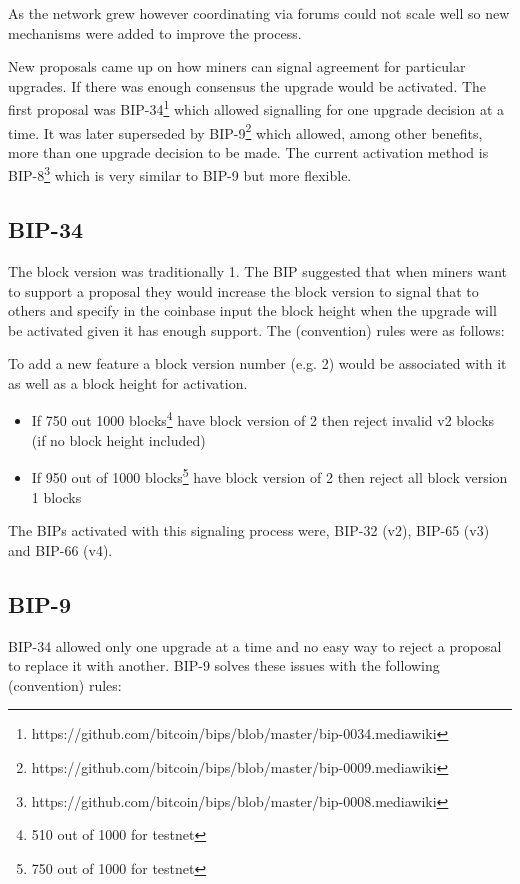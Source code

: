 As the network grew however coordinating via forums could not scale well so new mechanisms were added to improve the process.

New proposals came up on how miners can signal agreement for particular upgrades. If there was enough consensus the upgrade would be activated. The first proposal was BIP-34\footnote{https://github.com/bitcoin/bips/blob/master/bip-0034.mediawiki} which allowed signalling for one upgrade decision at a time. It was later superseded by BIP-9\footnote{https://github.com/bitcoin/bips/blob/master/bip-0009.mediawiki} which allowed, among other benefits, more than one upgrade decision to be made. The current activation method is BIP-8\footnote{https://github.com/bitcoin/bips/blob/master/bip-0008.mediawiki} which is very similar to BIP-9 but more flexible.

\subsection*{BIP-34}
The block version was traditionally 1. The BIP suggested that when miners want to support a proposal they would increase the block version to signal that to others and specify in the coinbase input the block height when the upgrade will be activated given it has enough support. The (convention) rules were as follows:

To add a new feature a block version number (e.g. 2) would be associated with it as well as a block height for activation.

\begin{itemize}
\item If 750 out 1000 blocks\footnote{510 out of 1000 for testnet} have block version of 2 then reject invalid v2 blocks (if no block height included)
\item If 950 out of 1000 blocks\footnote{750 out of 1000 for testnet} have block version of 2 then reject all block version 1 blocks
\end{itemize}

The BIPs activated with this signaling process were, BIP-32 (v2), BIP-65 (v3) and BIP-66 (v4).


\subsection*{BIP-9}
BIP-34 allowed only one upgrade at a time and no easy way to reject a proposal to replace it with another. BIP-9 solves these issues with the following (convention) rules:

